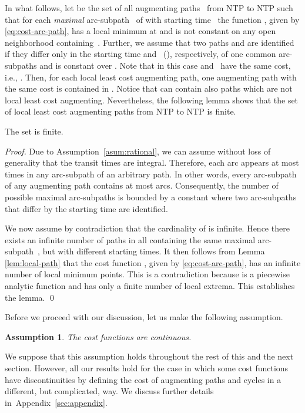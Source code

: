 \documentclass{svjour3}                     \smartqed
\newtheorem{asum}{Assumption}
\begin{document}
In what follows, let  be the set of all augmenting paths~ from NTP  to NTP  such that for each \emph{maximal} arc-subpath~ of  with starting time~ the function , given by \eqref{eq:cost-arc-path}, has a local minimum at  and is not constant on any open neighborhood containing~. Further, we assume that two paths  and  are identified if they differ only in the starting time  and~ (), respectively, of one common arc-subpaths  and  is constant over . Note that in this case  and~ have the same cost, i.e., . Then, for each local least cost augmenting path, one augmenting path with the same cost is contained in . Notice that  can contain also paths which are not local least cost augmenting. Nevertheless, the following lemma shows that the set of local least cost augmenting paths from NTP  to NTP  is finite.

\begin{lemma}
  \label{lem:analytic-nonempty-finite}
  The set  is finite.
\end{lemma}
\begin{proof}
Due to Assumption~\ref{asum:rational}, we can assume without loss of generality that the transit times are integral. Therefore, each arc  appears at most  times in any arc-subpath of an arbitrary path. In other words, every arc-subpath of any augmenting path contains at most  arcs. Consequently, the number of
possible maximal arc-subpaths is bounded by a constant where two arc-subpaths that differ by the starting time are identified.

We now assume by contradiction that the cardinality of  is infinite. Hence there exists an infinite number of paths in  all containing the same
maximal arc-subpath~, but with different starting times. It then follows from Lemma \ref{lem:local-path} that
the cost function , given by \eqref{eq:cost-arc-path}, has an infinite number of local minimum points. This is a contradiction because  is a piecewise analytic function and has only a finite number of local extrema. This establishes the lemma.
\qed\end{proof}


Before we proceed with our discussion, let us make the following assumption.
\begin{asum}
\label{asum:cost}
The cost functions  are continuous.
\end{asum}
We suppose that this assumption holds throughout the rest of this and the next section. However, all our results hold for the case in which some cost functions have discontinuities by defining the cost of augmenting paths and cycles in a different, but complicated, way. We discuss further details in~Appendix~\ref{sec:appendix}.
\end{document}
